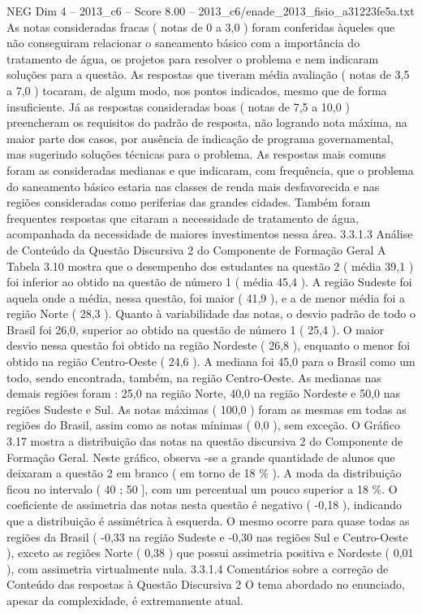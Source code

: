 \begin{textsample}{NEG Dim 4 – 2013\_c6 – Score 8.00 – 2013\_c6/enade\_2013\_fisio\_a31223fe5a.txt}
As notas consideradas fracas ( notas de 0 a 3,0 ) foram conferidas àqueles que não conseguiram relacionar o saneamento básico com a importância do tratamento de água, os projetos para resolver o problema e nem indicaram soluções para a questão.
As respostas que tiveram média avaliação ( notas de 3,5 a 7,0 ) tocaram, de algum modo, nos pontos indicados, mesmo que de forma insuficiente.
Já as respostas consideradas boas ( notas de 7,5 a 10,0 ) preencheram os requisitos do padrão de resposta, não logrando nota máxima, na maior parte dos casos, por ausência de indicação de programa governamental, mas sugerindo soluções técnicas para o problema.
As respostas mais comuns foram as consideradas medianas e que indicaram, com frequência, que o problema do saneamento básico estaria nas classes de renda mais desfavorecida e nas regiões consideradas como periferias das grandes cidades.
Também foram frequentes respostas que citaram a necessidade de tratamento de água, acompanhada da necessidade de maiores investimentos nessa área. 3.3.1.3 Análise de Conteúdo da Questão Discursiva 2 do Componente de Formação Geral A Tabela 3.10 mostra que o desempenho dos estudantes na questão 2 ( média 39,1 ) foi inferior ao obtido na questão de número 1 ( média 45,4 ).
A região Sudeste foi aquela onde a média, nessa questão, foi maior ( 41,9 ), e a de menor média foi a região Norte ( 28,3 ).
Quanto à variabilidade das notas, o desvio padrão de todo o Brasil foi 26,0, superior ao obtido na questão de número 1 ( 25,4 ).
O maior desvio nessa questão foi obtido na região Nordeste ( 26,8 ), enquanto o menor foi obtido na região Centro-Oeste ( 24,6 ).
A mediana foi 45,0 para o Brasil como um todo, sendo encontrada, também, na região Centro-Oeste.
As medianas nas demais regiões foram : 25,0 na região Norte, 40,0 na região Nordeste e 50,0 nas regiões Sudeste e Sul.
As notas máximas ( 100,0 ) foram as mesmas em todas as regiões do Brasil, assim como as notas mínimas ( 0,0 ), sem exceção.
O Gráfico 3.17 mostra a distribuição das notas na questão discursiva 2 do Componente de Formação Geral.
Neste gráfico, observa -se a grande quantidade de alunos que deixaram a questão 2 em branco ( em torno de 18 \% ).
A moda da distribuição ficou no intervalo ( 40 ; 50 ], com um percentual um pouco superior a 18 \%.
O coeficiente de assimetria das notas nesta questão é negativo ( -0,18 ), indicando que a distribuição é assimétrica à esquerda.
O mesmo ocorre para quase todas as regiões da Brasil ( -0,33 na região Sudeste e -0,30 nas regiões Sul e Centro-Oeste ), exceto as regiões Norte ( 0,38 ) que possui assimetria positiva e Nordeste ( 0,01 ), com assimetria virtualmente nula. 3.3.1.4 Comentários sobre a correção de Conteúdo das respostas à Questão Discursiva 2 O tema abordado no enunciado, apesar da complexidade, é extremamente atual.

\end{textsample}
